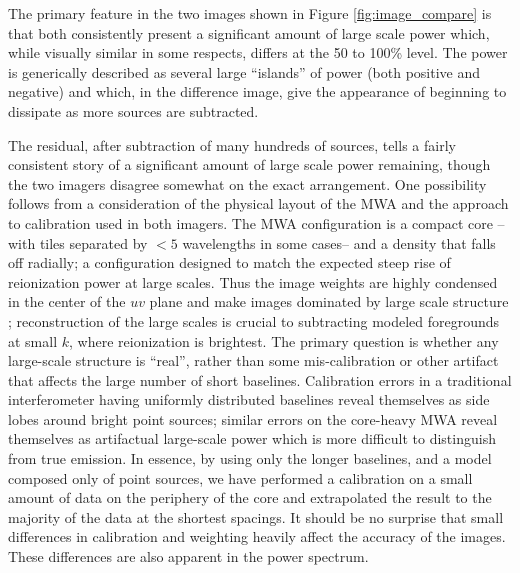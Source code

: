 \documentclass[preprint]{aastex}
\begin{document}
   The primary feature in the two images shown in Figure \ref{fig:image_compare} is that both consistently present a significant amount of large scale power which, while visually similar in some respects, differs at the 50 to 100\% level.  The power is generically described as several large ``islands'' of power (both positive and negative) and which, in the difference image, give the appearance of beginning to dissipate as more sources are subtracted.  


The residual, after subtraction of many hundreds of sources, tells a fairly consistent story of a significant amount of large scale power remaining, though the two imagers disagree somewhat on the exact arrangement.  One possibility follows from a consideration of the physical layout of the MWA and the  approach to calibration used in both imagers.  The MWA configuration is a compact core --with tiles separated by $<5$ wavelengths in some cases-- and a density that falls off radially; a configuration designed to match the expected steep rise of reionization power at large scales. Thus the image weights are highly condensed in the center of the $uv$ plane and make images dominated by large scale structure \cite{Beardsley:2013p9952}; reconstruction of the large scales is crucial to subtracting modeled foregrounds at small $k$, where reionization is brightest.   The primary question is whether any large-scale structure is ``real'', rather than some mis-calibration or other artifact that affects the large number of short baselines.  Calibration errors in a traditional interferometer having uniformly distributed baselines reveal themselves as side lobes around bright point sources; similar errors on the core-heavy MWA reveal themselves as artifactual large-scale power which is more difficult to distinguish from true emission.  In essence, by using only the longer baselines, and a model composed only of point sources, we have performed a calibration on a small amount of data on the periphery of the core and extrapolated the result to the majority of the data at the shortest spacings. It should be no surprise that small differences in calibration and weighting  heavily affect the accuracy of the images.  These differences are also apparent in the power spectrum.
\end{document}

